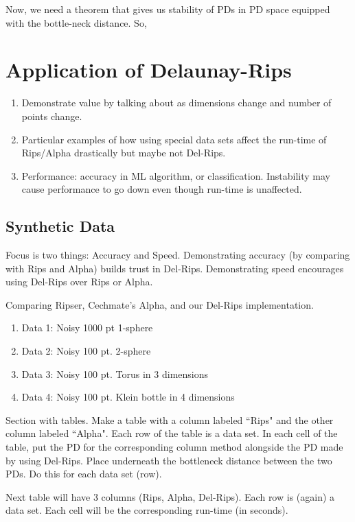 \documentclass[letterpaper,titlepage]{article}
\begin{document}
    Now, we need a theorem that gives us stability of PDs in PD space equipped with the bottle-neck distance. So,



    
\section{Application of Delaunay-Rips}
\begin{enumerate}
    \item Demonstrate value by talking about as dimensions change and number of points change.
    \item Particular examples of how using special data sets affect the run-time of Rips/Alpha drastically but maybe not Del-Rips.
    \item Performance: accuracy in ML algorithm, or classification. Instability may cause performance to go down even though run-time is unaffected.
\end{enumerate}

\subsection{Synthetic Data}
    Focus is two things: Accuracy and Speed. Demonstrating accuracy (by comparing with Rips and Alpha) builds trust in Del-Rips. Demonstrating speed encourages using Del-Rips over Rips or Alpha.

    Comparing Ripser, Cechmate's Alpha, and our Del-Rips implementation.
    \begin{enumerate}
        \item Data 1: Noisy 1000 pt 1-sphere
        \item Data 2: Noisy 100 pt. 2-sphere
        \item Data 3: Noisy 100 pt. Torus in 3 dimensions
        \item Data 4: Noisy 100 pt. Klein bottle in 4 dimensions
    \end{enumerate}

    Section with tables. Make a table with a column labeled ``Rips" and the other column labeled ``Alpha". Each row of the table is a data set. In each cell of the table, put the PD for the corresponding column method alongside the PD made by using Del-Rips. Place underneath the bottleneck distance between the two PDs. Do this for each data set (row).

    Next table will have 3 columns (Rips, Alpha, Del-Rips). Each row is (again) a data set. Each cell will be the corresponding run-time (in seconds).
       
\end{document}

